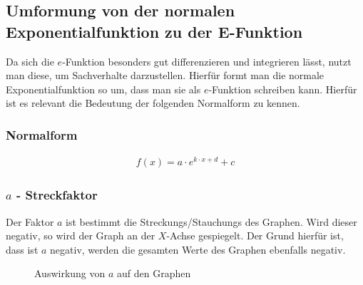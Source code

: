 \subsection{Umformung von der normalen Exponentialfunktion zu der E-Funktion}\label{sec:E-Funktion/Umformung von der normalen Exponentialfunktion zu der E-Funktion}
Da sich die $e$-Funktion besonders gut differenzieren und integrieren lässt, nutzt man diese, um Sachverhalte darzustellen. Hierfür formt man die normale Exponentialfunktion so um, dass man sie als $e$-Funktion schreiben kann. Hierfür ist es relevant die Bedeutung der folgenden Normalform zu kennen. 
\subsubsection{Normalform}\label{sec:E-Funktion/Umformung von der normalen Exponentialfunktion zu der E-Funktion/Normalform}
\begin{align*}
	f(x)=a\cdot e^{k\cdot x+d}+c
\end{align*}
\subsubsection{$a$ - Streckfaktor}\label{sec:E-Funktion/Umformung von der normalen Exponentialfunktion zu der E-Funktion/Normalform/a - Streckfaktor}
Der Faktor $a$ ist bestimmt die Streckungs/Stauchungs des Graphen. Wird dieser negativ, so wird der Graph an der $X$-Achse gespiegelt. Der Grund hierfür ist, dass ist $a$ negativ, werden die gesamten Werte des Graphen ebenfalls negativ. 
\begin{figure}[h]
\centering
	\caption{Auswirkung von $a$ auf den Graphen}
\end{figure}
\pagebreak
